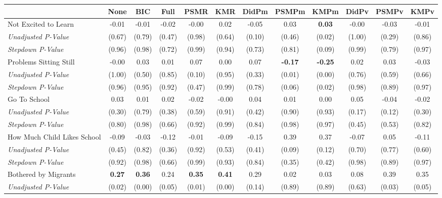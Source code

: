 \begin{tabular}{l c c c c c c c c c c c}
\toprule
 & None & BIC & Full & PSMR & KMR & DidPm & PSMPm & KMPm & DidPv & PSMPv & KMPv \\
\midrule
Not Excited to Learn & -0.01 & -0.01 & -0.02 & -0.00 & 0.02 & -0.05 & 0.03 & \textbf{ 0.03 } & -0.00 & -0.03 & -0.01 \\
\quad \textit{Unadjusted P-Value} & (0.67) & (0.79) & (0.47) & (0.98) & (0.64) & (0.10) & (0.46) & (0.02) & (1.00) & (0.29) & (0.86) \\
\quad \textit{Stepdown P-Value} & (0.96) & (0.98) & (0.72) & (0.99) & (0.94) & (0.73) & (0.81) & (0.09) & (0.99) & (0.79) & (0.97) \\
Problems Sitting Still & -0.00 & 0.03 & 0.01 & 0.07 & 0.00 & 0.07 & \textbf{ -0.17 } & \textbf{ -0.25 } & 0.02 & 0.03 & -0.03 \\
\quad \textit{Unadjusted P-Value} & (1.00) & (0.50) & (0.85) & (0.10) & (0.95) & (0.33) & (0.01) & (0.00) & (0.76) & (0.59) & (0.66) \\
\quad \textit{Stepdown P-Value} & (0.96) & (0.95) & (0.92) & (0.47) & (0.99) & (0.78) & (0.06) & (0.02) & (0.98) & (0.89) & (0.97) \\
Go To School & 0.03 & 0.01 & 0.02 & -0.02 & -0.00 & 0.04 & 0.01 & 0.00 & 0.05 & -0.04 & -0.02 \\
\quad \textit{Unadjusted P-Value} & (0.30) & (0.79) & (0.38) & (0.59) & (0.91) & (0.42) & (0.90) & (0.93) & (0.17) & (0.12) & (0.30) \\
\quad \textit{Stepdown P-Value} & (0.80) & (0.98) & (0.66) & (0.92) & (0.99) & (0.84) & (0.98) & (0.97) & (0.45) & (0.53) & (0.82) \\
How Much Child Likes School & -0.09 & -0.03 & -0.12 & -0.01 & -0.09 & -0.15 & 0.39 & 0.37 & -0.07 & 0.05 & -0.11 \\
\quad \textit{Unadjusted P-Value} & (0.45) & (0.82) & (0.36) & (0.92) & (0.53) & (0.41) & (0.09) & (0.12) & (0.70) & (0.77) & (0.60) \\
\quad \textit{Stepdown P-Value} & (0.92) & (0.98) & (0.66) & (0.99) & (0.93) & (0.84) & (0.35) & (0.42) & (0.98) & (0.89) & (0.97) \\
Bothered by Migrants & \textbf{ 0.27 } & \textbf{ 0.36 } & 0.24 & \textbf{ 0.35 } & \textbf{ 0.41 } & 0.29 & 0.02 & 0.03 & 0.08 & 0.39 & 0.35 \\
\quad \textit{Unadjusted P-Value} & (0.02) & (0.00) & (0.05) & (0.01) & (0.00) & (0.14) & (0.89) & (0.89) & (0.63) & (0.03) & (0.05) \\

\end{tabular}
